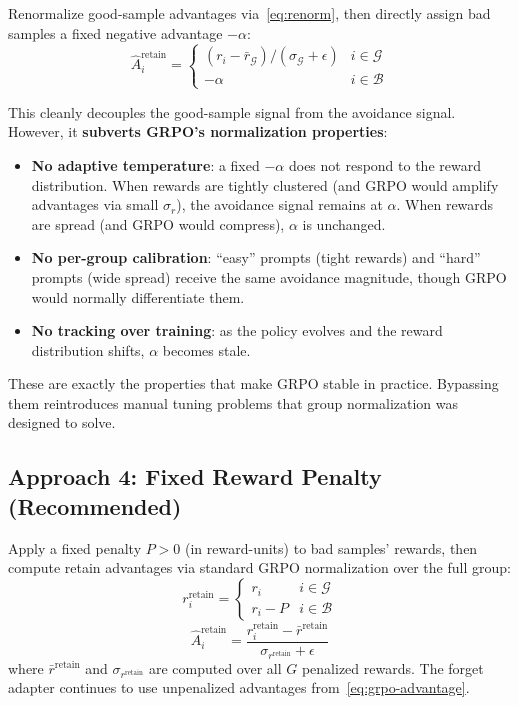 \documentclass[11pt]{article}
\begin{document}
Renormalize good-sample advantages via~\eqref{eq:renorm}, then directly assign
bad samples a fixed negative advantage $-\alpha$:
\begin{equation}
    \hat{A}_i^{\text{retain}} =
    \begin{cases}
        (r_i - \bar{r}_{\mathcal{G}}) / (\sigma_{\mathcal{G}} + \epsilon)
            & i \in \mathcal{G} \\
        -\alpha & i \in \mathcal{B}
    \end{cases}
\end{equation}

This cleanly decouples the good-sample signal from the avoidance signal.
However, it \textbf{subverts GRPO's normalization properties}:
\begin{itemize}[nosep]
    \item \textbf{No adaptive temperature}: a fixed $-\alpha$ does not respond
        to the reward distribution. When rewards are tightly clustered (and GRPO
        would amplify advantages via small $\sigma_r$), the avoidance signal
        remains at $\alpha$. When rewards are spread (and GRPO would compress),
        $\alpha$ is unchanged.
    \item \textbf{No per-group calibration}: ``easy'' prompts (tight rewards)
        and ``hard'' prompts (wide spread) receive the same avoidance magnitude,
        though GRPO would normally differentiate them.
    \item \textbf{No tracking over training}: as the policy evolves and the
        reward distribution shifts, $\alpha$ becomes stale.
\end{itemize}

These are exactly the properties that make GRPO stable in practice. Bypassing
them reintroduces manual tuning problems that group normalization was designed
to solve.

\subsection{Approach 4: Fixed Reward Penalty (Recommended)}\label{sec:penalty}

Apply a fixed penalty $P > 0$ (in reward-units) to bad samples' rewards, then
compute retain advantages via standard GRPO normalization over the full group:
\begin{equation}\label{eq:penalty}
    r_i^{\text{retain}} =
    \begin{cases}
        r_i & i \in \mathcal{G} \\
        r_i - P & i \in \mathcal{B}
    \end{cases}
\end{equation}
\begin{equation}\label{eq:penalty-advantage}
    \hat{A}_i^{\text{retain}}
    = \frac{r_i^{\text{retain}} - \bar{r}^{\text{retain}}}
           {\sigma_{r^{\text{retain}}} + \epsilon}
\end{equation}
where $\bar{r}^{\text{retain}}$ and $\sigma_{r^{\text{retain}}}$ are computed
over all $G$ penalized rewards. The forget adapter continues to use
unpenalized advantages from~\eqref{eq:grpo-advantage}.
\end{document}
